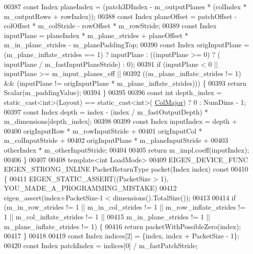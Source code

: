 \begin{DoxyCode}
00387     \textcolor{keyword}{const} Index planeIndex = (patch3DIndex - m\_outputPlanes * (colIndex * m\_outputRows + rowIndex));
00388     \textcolor{keyword}{const} Index planeOffset = patchOffset - colOffset * m\_colStride - rowOffset * m\_rowStride;
00389     \textcolor{keyword}{const} Index inputPlane = planeIndex * m\_plane\_strides + planeOffset * m\_in\_plane\_strides - 
      m\_planePaddingTop;
00390     \textcolor{keyword}{const} Index origInputPlane = (m\_plane\_inflate\_strides == 1) ? inputPlane : ((inputPlane >= 0) ? (
      inputPlane / m\_fastInputPlaneStride) : 0);
00391     \textcolor{keywordflow}{if} (inputPlane < 0 || inputPlane >= m\_input\_planes\_eff ||
00392         ((m\_plane\_inflate\_strides != 1) && (inputPlane != origInputPlane * m\_plane\_inflate\_strides))) \{
00393       \textcolor{keywordflow}{return} Scalar(m\_paddingValue);
00394     \}
00395 
00396     \textcolor{keyword}{const} \textcolor{keywordtype}{int} depth\_index = \textcolor{keyword}{static\_cast<}\textcolor{keywordtype}{int}\textcolor{keyword}{>}(Layout) == static\_cast<int>(
      \hyperlink{group__enums_ggaacded1a18ae58b0f554751f6cdf9eb13a0cbd4bdd0abcfc0224c5fcb5e4f6669a}{ColMajor}) ? 0 : NumDims - 1;
00397     \textcolor{keyword}{const} Index depth = index - (index / m\_fastOutputDepth) * m\_dimensions[depth\_index];
00398 
00399     \textcolor{keyword}{const} Index inputIndex = depth +
00400         origInputRow * m\_rowInputStride +
00401         origInputCol * m\_colInputStride +
00402         origInputPlane * m\_planeInputStride +
00403         otherIndex * m\_otherInputStride;
00404 
00405     \textcolor{keywordflow}{return} m\_impl.coeff(inputIndex);
00406   \}
00407 
00408   \textcolor{keyword}{template}<\textcolor{keywordtype}{int} LoadMode>
00409   EIGEN\_DEVICE\_FUNC EIGEN\_STRONG\_INLINE PacketReturnType packet(Index index)\textcolor{keyword}{ const}
00410 \textcolor{keyword}{  }\{
00411     EIGEN\_STATIC\_ASSERT((PacketSize > 1), YOU\_MADE\_A\_PROGRAMMING\_MISTAKE)
00412     eigen\_assert(index+PacketSize-1 < dimensions().TotalSize());
00413 
00414     \textcolor{keywordflow}{if} (m\_in\_row\_strides != 1 || m\_in\_col\_strides != 1 || m\_row\_inflate\_strides != 1 || 
      m\_col\_inflate\_strides != 1 ||
00415         m\_in\_plane\_strides != 1 || m\_plane\_inflate\_strides != 1) \{
00416       \textcolor{keywordflow}{return} packetWithPossibleZero(index);
00417     \}
00418 
00419     \textcolor{keyword}{const} Index indices[2] = \{index, index + PacketSize - 1\};
00420     \textcolor{keyword}{const} Index patchIndex = indices[0] / m\_fastPatchStride;

\end{DoxyCode}
